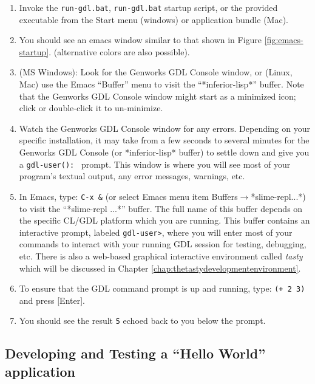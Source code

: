 \documentclass [11pt]{book}
\begin{document}
\begin{enumerate}

\item Invoke the \texttt{run-gdl.bat}, \texttt{run-gdl.bat}
startup script, or the provided executable from the Start
menu (windows) or application bundle (Mac).

\item You should see an emacs window similar to that shown in Figure 
\ref{fig:emacs-startup}. (alternative colors are also possible).

\item (MS Windows): Look for the Genworks GDL Console
window, or (Linux, Mac) use the Emacs ``Buffer'' menu to visit the
``*inferior-lisp*'' buffer. Note that the Genworks GDL Console
window might start as a minimized icon; click or double-click it to
un-minimize.

\item Watch the Genworks GDL Console window for any
errors. Depending on your specific installation, it may take from a
few seconds to several minutes for the Genworks GDL Console (or
*inferior-lisp* buffer) to settle down and give you a \texttt{gdl-user(): } prompt. This window is where you will see most of your program's textual output, any 
error messages, warnings, etc.

\item In Emacs, type: \texttt{C-x \&} (or select Emacs menu item Buffers$\rightarrow$*slime-repl...*) to visit the ``*slime-repl ...*'' buffer. The full name
of this buffer depends on the specific CL/GDL platform which you are
running. This buffer contains an interactive prompt, labeled \texttt{gdl-user>}, where you will enter most of your commands to interact with your running GDL session
for testing, debugging, etc. There is also a web-based graphical interactive environment called \emph{tasty} which will be discussed in Chapter 
\ref{chap:thetastydevelopmentenvironment}.

\item To ensure that the GDL command prompt is up and running, type: \texttt{(+ 2 3)} and press [Enter].

\item You should see the result \texttt{5} echoed back to you below the prompt.

\end{enumerate}



\subsection{Developing and Testing a  ``Hello World'' application}
\end{document}
